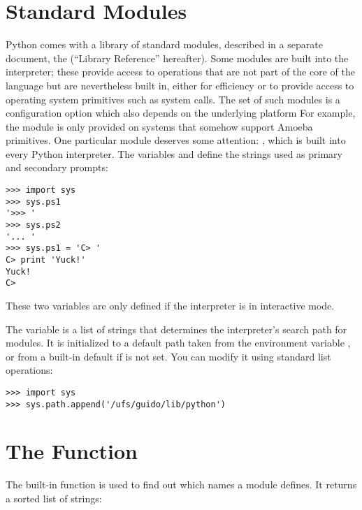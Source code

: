 \documentclass{manual}
\begin{document}
\section{Standard Modules \label{standardModules}}

Python comes with a library of standard modules, described in a separate
document, the 
(``Library Reference'' hereafter).  Some modules are built into the
interpreter; these provide access to operations that are not part of
the core of the language but are nevertheless built in, either for
efficiency or to provide access to operating system primitives such as
system calls.  The set of such modules is a configuration option which
also depends on the underlying platform  For example,
the  module is only provided on systems that somehow
support Amoeba primitives.  One particular module deserves some
attention: %
, which is built into every 
Python interpreter.  The variables  and
 define the strings used as primary and secondary
prompts:

\begin{verbatim}
>>> import sys
>>> sys.ps1
'>>> '
>>> sys.ps2
'... '
>>> sys.ps1 = 'C> '
C> print 'Yuck!'
Yuck!
C>

\end{verbatim}

These two variables are only defined if the interpreter is in
interactive mode.

The variable  is a list of strings that determines the
interpreter's search path for modules. It is initialized to a default
path taken from the environment variable , or from
a built-in default if  is not set.  You can modify
it using standard list operations: 

\begin{verbatim}
>>> import sys
>>> sys.path.append('/ufs/guido/lib/python')
\end{verbatim}

\section{The  Function \label{dir}}

The built-in function  is used to find out which names
a module defines.  It returns a sorted list of strings:
\end{document}

